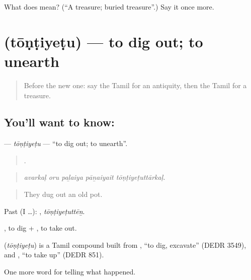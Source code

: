 \begin{tcolorbox}[breakable,colback=teal!4,colframe=teal!35!black,title={Before you move on}]
What does  mean? (\textquotedblleft{}A treasure; buried treasure\textquotedblright{}.) Say it once more.
\end{tcolorbox}
\section[\texorpdfstring{\ta{தோண்டியெடு} (tōṇṭiyeṭu)}{தோண்டியெடு (tōṇṭiyeṭu)}]{ (tōṇṭiyeṭu) — to dig out; to unearth}

\label{lesson:TA-C341-tontiyetu}



\begin{quote}
Before the new one: say the Tamil for an antiquity, then the Tamil for a treasure.
\end{quote}

\subsection*{You'll want to know: }
\textbf{} — \emph{tōṇṭiyeṭu} — \textquotedblleft{}to dig out; to unearth\textquotedblright{}.

\begin{quote}
    .
\end{quote}

\begin{quote}
\emph{avarkaḷ oru paḻaiya pāṉaiyait tōṇṭiyeṭuttārkaḷ.}
\end{quote}

\begin{quote}
They dug out an old pot.
\end{quote}

Past (I …): , \emph{tōṇṭiyeṭuttēṉ}.

, to dig + , to take out.

\begin{cousinweb}
\textbf{} (\emph{tōṇṭiyeṭu}) is a Tamil compound built from , \textquotedblleft{}to dig, excavate\textquotedblright{} (DEDR 3549), and , \textquotedblleft{}to take up\textquotedblright{} (DEDR 851).
\end{cousinweb}

\begin{grammarlens}[title={What you've built}]
One more word for telling what happened.
\end{grammarlens}

